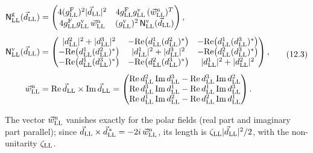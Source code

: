 \documentclass[
  10pt,
]{article}
\begin{document}
\[\begin{aligned}\mathsf N^{\rm g}_{\rm LL}(\vec d_{\rm LL})&=\begin{pmatrix}4(g^{\rm F}_{\rm LL})^2\lvert\vec d_{\rm LL}\rvert^2&4g^{\rm F}_{\rm LL}g^{\rm v}_{\rm LL}\,(\vec w^{\rm n}_{\rm LL})^T\\4g^{\rm F}_{\rm LL}g^{\rm v}_{\rm LL}\,\vec w^{\rm n}_{\rm LL}&(g^{\rm v}_{\rm LL})^2\,\mathsf N^{\rm v}_{\rm LL}(\vec d_{\rm LL})\end{pmatrix},\\[4pt]\mathsf N^{\rm v}_{\rm LL}(\vec d_{\rm LL})&=\begin{pmatrix}\lvert d^2_{\rm LL}\rvert^2+\lvert d^3_{\rm LL}\rvert^2&-{\rm Re}\big(d^1_{\rm LL}(d^2_{\rm LL})^*\big)&-{\rm Re}\big(d^1_{\rm LL}(d^3_{\rm LL})^*\big)\\-{\rm Re}\big(d^1_{\rm LL}(d^2_{\rm LL})^*\big)&\lvert d^1_{\rm LL}\rvert^2+\lvert d^3_{\rm LL}\rvert^2&-{\rm Re}\big(d^2_{\rm LL}(d^3_{\rm LL})^*\big)\\-{\rm Re}\big(d^1_{\rm LL}(d^3_{\rm LL})^*\big)&-{\rm Re}\big(d^2_{\rm LL}(d^3_{\rm LL})^*\big)&\lvert d^1_{\rm LL}\rvert^2+\lvert d^2_{\rm LL}\rvert^2\end{pmatrix},\\[4pt]\vec w^{\rm n}_{\rm LL}&={\rm Re}\,\vec d_{\rm LL}\times{\rm Im}\,\vec d_{\rm LL}=\begin{pmatrix}{\rm Re}\,d^2_{\rm LL}\,{\rm Im}\,d^3_{\rm LL}-{\rm Re}\,d^3_{\rm LL}\,{\rm Im}\,d^2_{\rm LL}\\{\rm Re}\,d^3_{\rm LL}\,{\rm Im}\,d^1_{\rm LL}-{\rm Re}\,d^1_{\rm LL}\,{\rm Im}\,d^3_{\rm LL}\\{\rm Re}\,d^1_{\rm LL}\,{\rm Im}\,d^2_{\rm LL}-{\rm Re}\,d^2_{\rm LL}\,{\rm Im}\,d^1_{\rm LL}\end{pmatrix}.\end{aligned}\tag{12.3}\]

The vector \(\vec w^{\rm n}_{\rm LL}\) vanishes exactly for the polar
fields (real part and imaginary part parallel); since
\(\vec d_{\rm LL}\times\vec d^{\,*}_{\rm LL}=-2i\,\vec w^{\rm n}_{\rm LL}\),
its length is \(\zeta_{\rm LL}\lvert\vec d_{\rm LL}\rvert^2/2\), with
the non-unitarity \(\zeta_{\rm LL}\).
\end{document}
